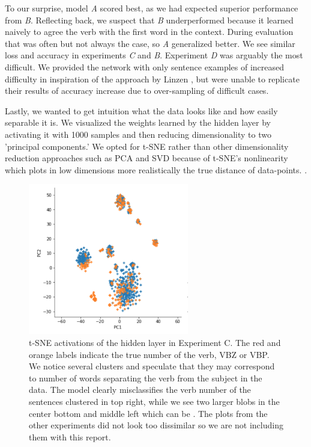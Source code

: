 \documentclass{article}
\begin{document}
To our surprise, model \textit{A} scored best, as we had expected superior performance from \textit{B}. Reflecting back, we suspect that \textit{B} underperformed because it learned naively to agree the verb with the first word in the context. During evaluation that was often but not always the case, so \textit{A} generalized better. We see similar loss and accuracy in experiments \textit{C} and \textit{B}. Experiment \textit{D} was arguably the most difficult. We provided the network with only sentence examples of increased difficulty in inspiration of the approach by Linzen \citep{Linzen:2016ud}, but were unable to replicate their results of accuracy increase due to over-sampling of difficult cases.

Lastly, we  wanted to get intuition what the data looks like and how easily separable it is. We visualized the weights learned by the hidden layer by activating it with 1000 samples and then reducing dimensionality to two 'principal components.' We opted for t-SNE rather than other dimensionality reduction approaches such as PCA and SVD because of t-SNE's nonlinearity which plots in low dimensions more realistically the true distance of data-points.
\citep{vanderMaaten:2008tm}.

\begin{figure}[h!]
\centering
\includegraphics[width=7cm]{figures/t-SNE_activations_of_hidd_layer_on_direct.png} 
\caption{t-SNE activations of the hidden layer in Experiment C. The red and orange labels indicate the true number of the verb, VBZ or VBP. We notice several clusters and speculate that they may correspond to number of words separating the verb from the subject in the data. The model clearly misclassifies the verb number of the sentences clustered in top right, while we see two larger blobs in the center bottom and middle left which can be . The plots from the other experiments did not look too dissimilar so we are not including them with this report.}
\end{figure}
\end{document}
